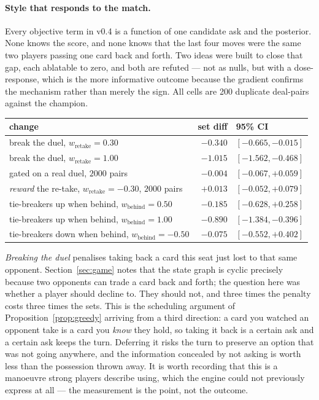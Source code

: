 \documentclass[11pt,a4paper]{article}
\begin{document}
\paragraph{Style that responds to the match.} Every objective term in v0.4 is a
function of one candidate ask and the posterior. None knows the score, and none
knows that the last four moves were the same two players passing one card back
and forth. Two ideas were built to close that gap, each ablatable to zero, and
both are refuted --- not as nulls, but with a dose-response, which is the more
informative outcome because the gradient confirms the mechanism rather than
merely the sign. All cells are 200 duplicate deal-pairs against the champion.

\begin{center}
\small
\begin{tabular}{lrl}
\toprule
change & set diff & 95\% CI \\
\midrule
break the duel, $w_{\mathrm{retake}} = 0.30$ & $-0.340$ & $[-0.665, -0.015]$ \\
break the duel, $w_{\mathrm{retake}} = 1.00$ & $\mathbf{-1.015}$ & $[-1.562, -0.468]$ \\
\quad gated on a real duel, $2000$ pairs & $-0.004$ & $[-0.067, +0.059]$ \\
\emph{reward} the re-take, $w_{\mathrm{retake}} = -0.30$, $2000$ pairs & $+0.013$ & $[-0.052, +0.079]$ \\
\midrule
tie-breakers up when behind, $w_{\mathrm{behind}} = 0.50$ & $-0.185$ & $[-0.628, +0.258]$ \\
tie-breakers up when behind, $w_{\mathrm{behind}} = 1.00$ & $\mathbf{-0.890}$ & $[-1.384, -0.396]$ \\
tie-breakers down when behind, $w_{\mathrm{behind}} = -0.50$ & $-0.075$ & $[-0.552, +0.402]$ \\
\bottomrule
\end{tabular}
\end{center}

\emph{Breaking the duel} penalises taking back a card this seat just lost to that
same opponent. Section~\ref{sec:game} notes that the state graph is cyclic
precisely because two opponents can trade a card back and forth; the question
here was whether a player should decline to. They should not, and three times the
penalty costs three times the sets. This is the scheduling argument of
Proposition~\ref{prop:greedy} arriving from a third direction: a card you watched
an opponent take is a card you \emph{know} they hold, so taking it back is a
certain ask and a certain ask keeps the turn. Deferring it risks the turn to
preserve an option that was not going anywhere, and the information concealed by
not asking is worth less than the possession thrown away. It is worth recording
that this is a manoeuvre strong players describe using, which the engine could
not previously express at all --- the measurement is the point, not the outcome.
\end{document}

